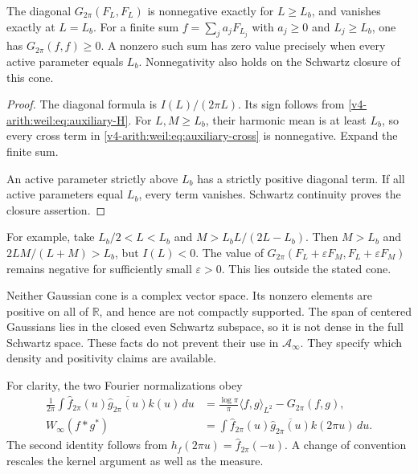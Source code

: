 \begin{proposition}
\label{v4-arith:weil:prop:auxiliary-cone}
The diagonal \(G_{2\pi}(F_L,F_L)\) is nonnegative exactly for
\(L\ge L_b\), and vanishes exactly at \(L=L_b\).
For a finite sum \(f=\sum_j a_jF_{L_j}\) with \(a_j\ge0\) and
\(L_j\ge L_b\), one has \(G_{2\pi}(f,f)\ge0\).
A nonzero such sum has zero value precisely when every active
parameter equals \(L_b\). Nonnegativity also holds on the
Schwartz closure of this cone.
\end{proposition}
\begin{proof}
The diagonal formula is \(I(L)/(2\pi L)\).
Its sign follows from \eqref{v4-arith:weil:eq:auxiliary-H}.
For \(L,M\ge L_b\), their harmonic mean is at least \(L_b\), so
every cross term in \eqref{v4-arith:weil:eq:auxiliary-cross}
is nonnegative. Expand the finite sum.

An active parameter strictly above \(L_b\) has a strictly positive
diagonal term. If all active parameters equal \(L_b\), every term
vanishes. Schwartz continuity proves the closure assertion.
\end{proof}

For example, take \(L_b/2<L<L_b\) and
\(M>L_bL/(2L-L_b)\). Then \(M>L_b\) and
\(2LM/(L+M)>L_b\), but \(I(L)<0\).
The value of \(G_{2\pi}(F_L+\varepsilon F_M,
F_L+\varepsilon F_M)\) remains negative for sufficiently small
\(\varepsilon>0\). This lies outside the stated cone.

Neither Gaussian cone is a complex vector space. Its nonzero elements
are positive on all of \(\mathbb R\), and hence are not compactly
supported. The span of centered Gaussians lies in the closed even
Schwartz subspace, so it is not dense in the full Schwartz space.
These facts do not prevent their use in \(\mathscr A_\infty\).
They specify which density and positivity claims are available.

For clarity, the two Fourier normalizations obey
\[
 \begin{aligned}
 \frac1{2\pi}\int\widehat f_{2\pi}(u)
       \overline{\widehat g_{2\pi}(u)}k(u)\,du
   &=\frac{\log\pi}{\pi}\langle f,g\rangle_{L^2}
                                      -G_{2\pi}(f,g),\\
 W_\infty(f*g^*)&=\int\widehat f_{2\pi}(u)
               \overline{\widehat g_{2\pi}(u)}k(2\pi u)\,du.
 \end{aligned}
\]
The second identity follows from \(h_f(2\pi u)=\widehat f_{2\pi}(-u)\).
A change of convention rescales the kernel argument as well as the
measure.

